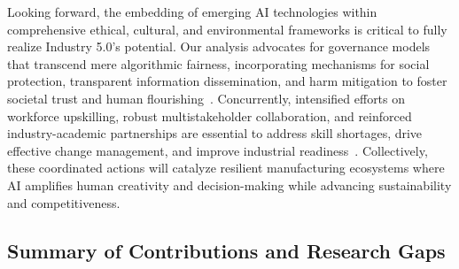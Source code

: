 \documentclass[sigconf]{acmart}
\begin{document}
Looking forward, the embedding of emerging AI technologies within comprehensive ethical, cultural, and environmental frameworks is critical to fully realize Industry 5.0’s potential. Our analysis advocates for governance models that transcend mere algorithmic fairness, incorporating mechanisms for social protection, transparent information dissemination, and harm mitigation to foster societal trust and human flourishing~\cite{ref25}. Concurrently, intensified efforts on workforce upskilling, robust multistakeholder collaboration, and reinforced industry-academic partnerships are essential to address skill shortages, drive effective change management, and improve industrial readiness~\cite{ref2,ref3,ref21}. Collectively, these coordinated actions will catalyze resilient manufacturing ecosystems where AI amplifies human creativity and decision-making while advancing sustainability and competitiveness.

\subsection{Summary of Contributions and Research Gaps}
\end{document}
